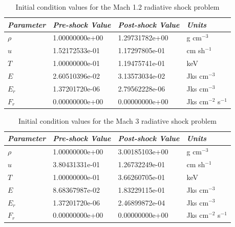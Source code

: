 \documentclass[preprint,12pt]{elsarticle}
\begin{document}
\begin{table}[ht]
  \centering
  \caption{\label{tab:mach1.2_shock_IC}Initial condition values for the Mach 1.2 radiative shock problem}
  \begin{tabular}{l l l l}\hline
      \emph{Parameter} & \emph{Pre-shock Value} & \emph{Post-shock Value} & \emph{Units}\\\hline
$\rho$ & 1.00000000e+00 & 1.29731782e+00 & g cm$^{-3}$ \\
$u$ & 1.52172533e-01 & 1.17297805e-01 & cm sh$^{-1}$ \\
$T$ & 1.00000000e-01 & 1.19475741e-01 & keV \\
$E$ & 2.60510396e-02 & 3.13573034e-02 & Jks cm$^{-3}$\\
$E_r$ & 1.37201720e-06 & 2.79562228e-06 & Jks cm$^{-3}$ \\
$F_r$ & 0.00000000e+00 & 0.00000000e+00 & Jks cm$^{-2}$ s$^{-1}$ \\
      \hline
  \end{tabular}
\end{table}
\begin{table}[ht]
  \centering
  \caption{
  \label{tab:mach3.0_shock_IC}
  Initial condition values for the Mach 3 radiative shock problem}
  \begin{tabular}{l l l l}\hline
      \emph{Parameter} & \emph{Pre-shock Value} & \emph{Post-shock Value} & \emph{Units}\\\hline
$\rho$ & 1.00000000e+00 & 3.00185103e+00 & g cm$^{-3}$ \\
$u$ & 3.80431331e-01 & 1.26732249e-01 & cm sh$^{-1}$ \\
$T$ & 1.00000000e-01 & 3.66260705e-01 & keV \\
$E$ & 8.68367987e-02 & 1.83229115e-01 & Jks cm$^{-3}$\\
$E_r$ & 1.37201720e-06 & 2.46899872e-04 & Jks cm$^{-3}$ \\
$F_r$ & 0.00000000e+00 & 0.00000000e+00 & Jks cm$^{-2}$ s$^{-1}$ \\
      \hline 
  \end{tabular}
\end{table}
\end{document}
